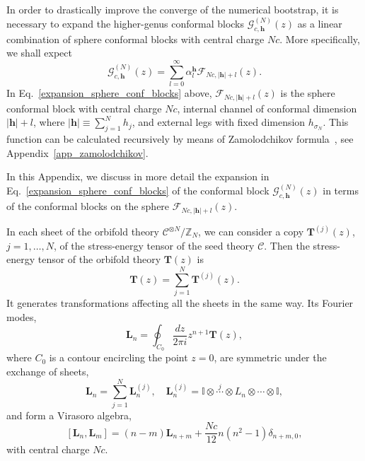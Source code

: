 \documentclass[a4paper,11pt]{article}
\begin{document}
In order to drastically improve the converge of the numerical bootstrap, it is necessary to expand the higher-genus conformal blocks $\mathcal{G}_{c,\boldsymbol{h}}^{(N)}(z)$ as a linear combination of sphere conformal blocks with central charge $Nc$. More specifically, we shall expect
\begin{equation}\label{expansion_sphere_conf_blocks}
 \mathcal{G}_{c, \boldsymbol{h}}^{(N)}(z)=\sum_{l=0}^{\infty}\alpha_{l}^{\boldsymbol{h}}
 \mathcal{F}_{Nc, |\boldsymbol{h}|+l}(z).
\end{equation}
In Eq.~\eqref{expansion_sphere_conf_blocks} above,  $\mathcal{F}_{Nc, |\boldsymbol{h}|+l}(z)$ is the sphere conformal block 
with central charge $Nc$, internal channel of conformal dimension $|\boldsymbol{h}|+l$, where $|\boldsymbol{h}|\equiv \sum_{j=1}^N h_j$, and external legs with fixed dimension 
$h_{\sigma_N}$. This function can be calculated
recursively by means of Zamolodchikov formula~\cite{Zamolodchikov2, Zamolodchikov}, see Appendix~\ref{app_zamolodchikov}.

In this Appendix, we discuss in more detail the expansion in Eq.~\eqref{expansion_sphere_conf_blocks} of the
conformal block $\mathcal{G}_{c, \boldsymbol{h}}^{(N)}(z)$ in terms of the conformal 
blocks on the sphere $\mathcal{F}_{Nc, |\boldsymbol{h}|+l}(z)$.

In each sheet of the orbifold theory $\mathcal{C}^{\otimes N}/\mathbb{Z}_N$, we 
can consider a copy $\boldsymbol{T}^{(j)}(z)$, $j=1,\dots, N$, of the stress-energy tensor of 
the seed theory $\mathcal{C}$. Then the stress-energy tensor of the 
orbifold theory $\boldsymbol{T}(z)$ is 
\begin{equation}\label{hatT}
 \boldsymbol{T}(z)=\sum_{j=1}^N \boldsymbol{T}^{(j)}(z).
\end{equation}
It generates transformations affecting all the sheets in the same way. 
Its Fourier modes,
\begin{equation}
 \boldsymbol{L}_n=\oint_{C_0}\frac{dz}{2\pi i} z^{n+1}\boldsymbol{T}(z),
\end{equation}
where $C_0$ is a contour encircling the point $z=0$, are symmetric 
under the exchange of sheets, 
\begin{equation}
 \boldsymbol{L}_n=\sum_{j=1}^N \boldsymbol{L}_n^{(j)}, \quad 
 \boldsymbol{L}_n^{(j)}=\mathbb{I}\otimes \overset{j}{\cdots} \otimes L_{n}\otimes \cdots \otimes \mathbb{I},
\end{equation}
and form a Virasoro algebra, 
\begin{equation}\label{symm_virasoro_alg}
 [\boldsymbol{L}_n, \boldsymbol{L}_{m}]=(n-m)\boldsymbol{L}_{n+m}+\frac{Nc}{12}n(n^2-1)\delta_{n+m, 0},
\end{equation}
with central charge $Nc$.
\end{document}

